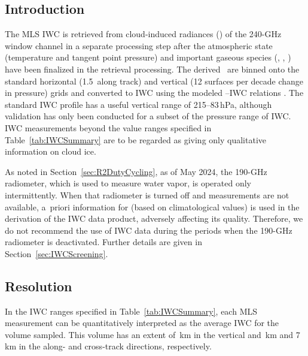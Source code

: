 
\subsection{Introduction}

The MLS IWC is retrieved from cloud-induced radiances (\Tcir) of the 240\nobreakdash-GHz window channel in a separate processing step after the atmospheric state (temperature and tangent point pressure) and important gaseous species (, , ) have been finalized in the retrieval processing. The derived \Tcir\ are binned onto the standard horizontal (1.5\degsym\ along track) and vertical (12 surfaces per decade change in pressure) grids and converted to IWC using the modeled \Tcir--IWC relations \citep{WuEtal:2006}. The standard IWC profile has a useful vertical range of 215--83\,hPa, although validation has only been conducted for a subset of the pressure range of IWC\@. IWC measurements beyond the value ranges specified in Table~\ref{tab:IWCSummary} are to be regarded as giving only qualitative information on cloud ice.

As noted in Section~\ref{sec:R2DutyCycling}, as of May 2024, the \mbox{190\nobreakdash-GHz} radiometer, which is used to measure water vapor, is operated only intermittently. When that radiometer is turned off and  measurements are not available, a~priori information for  (based on climatological values) is used in the derivation of the IWC data product, adversely affecting its quality. Therefore, we do not recommend the use of IWC data during the periods when the \mbox{190\nobreakdash-GHz} radiometer is deactivated. Further details are given in Section~\ref{sec:IWCScreening}.

\subsection{Resolution}

In the IWC ranges specified in Table~\ref{tab:IWCSummary}, each MLS measurement can be quantitatively interpreted as the average IWC for the volume sampled. This volume has an extent of \,km in the vertical and \,km and 7\,km in the along- and cross-track directions, respectively.

